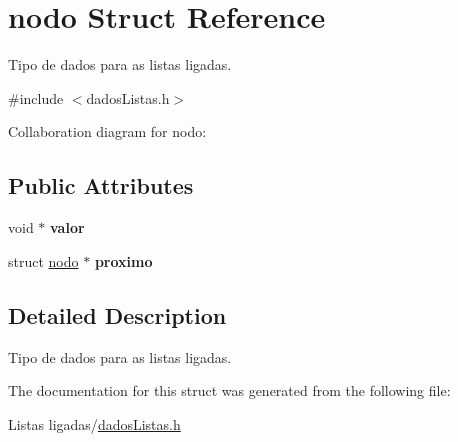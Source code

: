 \hypertarget{structnodo}{}\section{nodo Struct Reference}
\label{structnodo}


Tipo de dados para as listas ligadas.  




{\ttfamily \#include $<$dados\+Listas.\+h$>$}



Collaboration diagram for nodo\+:
\subsection*{Public Attributes}
\begin{DoxyCompactItemize}
\item 
\mbox{\label{structnodo_ab63adcdb83ea1fdcf4fa10f3cafc4a6a}} 
void $\ast$ {\bfseries valor}
\item 
\mbox{\label{structnodo_aaaabdcb6641ddcdac8990402242b154a}} 
struct \hyperlink{structnodo}{nodo} $\ast$ {\bfseries proximo}
\end{DoxyCompactItemize}


\subsection{Detailed Description}
Tipo de dados para as listas ligadas. 

The documentation for this struct was generated from the following file\+:\begin{DoxyCompactItemize}
\item 
Listas ligadas/\hyperlink{dadosListas_8h}{dados\+Listas.\+h}\end{DoxyCompactItemize}
